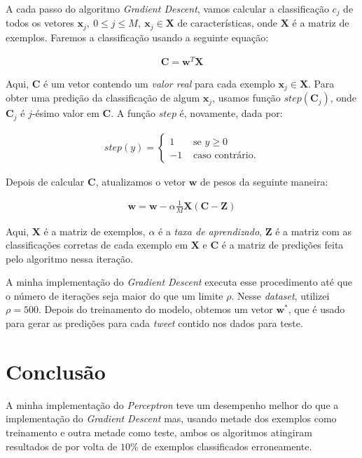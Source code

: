 \documentclass[a4paper, 12pt]{article}
\begin{document}
A cada passo do algoritmo \textit{Gradient Descent}, vamos calcular a
classificação $c_j$ de todos os vetores $\boldsymbol{x}_j,\: 0 \leq j \leq M,\: \boldsymbol{x}_j \in
\boldsymbol{X}$ de características, onde $\boldsymbol{X}$ é a matriz
de exemplos. Faremos a classificação usando a seguinte equação:

\begin{align*}
    \boldsymbol{C} = \boldsymbol{w}^{T}\boldsymbol{X}
\end{align*}

Aqui, $\boldsymbol{C}$ é um vetor contendo um \textit{valor real} para
cada exemplo $\boldsymbol{x}_j \in \boldsymbol{X}$. Para obter uma predição
da classificação de algum $\boldsymbol{x}_j$, usamos função $step(\boldsymbol{C}_j)$,
onde $\boldsymbol{C}_j$ é $j$-ésimo valor em $\boldsymbol{C}$. A função $step$
é, novamente, dada por:

\begin{align*}
    step(y) = \begin{cases}
        1 & \text{ se } y \geq 0 \\
        -1 & \text{ caso contrário.}
    \end{cases}
\end{align*}

Depois de calcular $\boldsymbol{C}$,  atualizamos o vetor $\boldsymbol{w}$
de pesos da seguinte maneira:

\begin{align*}
    \boldsymbol{w} = \boldsymbol{w} - \alpha \frac{1}{M} \boldsymbol{X}(\boldsymbol{C} - \boldsymbol{Z})
\end{align*}

Aqui, $\boldsymbol{X}$ é a matriz de exemplos, $\alpha$ é a \textit{taxa de
aprendizado}, $\boldsymbol{Z}$ é a matriz com as classificações corretas de
cada exemplo em $\boldsymbol{X}$ e $\boldsymbol{C}$ é a matriz de predições
feita pelo algoritmo nessa iteração.

A minha implementação do \textit{Gradient Descent} executa esse procedimento
até que o número de iterações seja maior do que um limite $\rho$. Nesse
\textit{dataset}, utilizei $\rho = 500$. Depois do treinamento do modelo,
obtemos um vetor $\boldsymbol{w}^{*}$, que é usado para gerar as predições para cada
\textit{tweet} contido nos dados para teste.

\section{Conclusão} \label{sec:concl}

A minha implementação do \textit{Perceptron} teve um desempenho melhor do que a
implementação do \textit{Gradient Descent} mas, usando metade dos exemplos como
treinamento e outra metade como teste, ambos os algoritmos atingiram resultados
de por volta de $10\%$ de exemplos classificados erroneamente.
\end{document}
